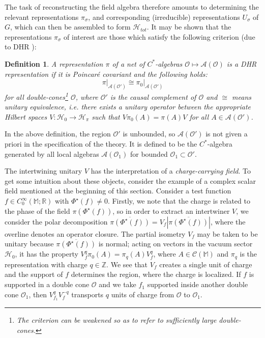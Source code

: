 \documentclass[12pt]{article}
\newcommand{\1}{\mathds{1}}                         %
\newcommand{\ZZ}{\mathbb{Z}} %
\newcommand{\RR}{\mathbb{R}}           %
\newcommand{\M}{\mathbb{M}} 	     %
\newcommand{\Hcal}{\mathcal {H}}
\newcommand{\Ocal}{\mathcal{O}}
\newcommand{\MM}{\mathbb{M}}
\newcommand{\HH}{{\mathcal{H}}}
\newcommand{\Ac}{{\mathcal{A}}}
\newcommand{\Cc}{{\mathcal{C}}}
\newcommand{\CoinX}[1]{C_0^\infty(#1)}
\newcommand{\be}{\begin{equation}}
\newcommand{\ee}{\end{equation}}
\newtheorem{df}[theorem]{Definition}}
\begin{document}
The task of reconstructing the field algebra therefore amounts to determining the relevant representations $\pi_\sigma$, and corresponding (irreducible) representations $U_\sigma$ of $G$, which
can then be assembled to form $\Hcal_{tot}$. It may be shown that the representations $\pi_\sigma$ of interest are those which satisfy the following criterion (due to DHR \cite{DHR3}):
\vskip 0.1in
\begin{df}
	A representation $\pi$ of a net of $C^*$-algebras $\Ocal\mapsto\Ac(\Ocal)$ is a \emph{DHR representation} if it is Poincar\'e covariant and the following holds:
	\be\label{DHRcrit}
	\pi\big|_{\Ac(\Ocal')}\cong \pi_0\big|_{\Ac(\Ocal')}
	\ee
	for all double-cones\footnote{The criterion can be weakened so as to refer to sufficiently large double-cones.} $\Ocal$, where $\Ocal'$ is the causal complement of $\Ocal$ and $\cong$ means unitary equivalence, i.e. there exists a unitary operator between the appropriate Hilbert spaces $V:\Hcal_{0}\rightarrow \Hcal_{\pi}$ such that $V\pi_0(A)=\pi(A) V$ for all $A\in \Ac(\Ocal')$.
\end{df}
In the above definition, the region $\Ocal'$ is unbounded, so $\Ac(\Ocal')$ is not given a priori in the specification of the theory. It is defined to be the $C^*$-algebra generated by all local algebras $\Ac(\Ocal_1)$ for bounded $\Ocal_1\subset \Ocal'$. 

The intertwining unitary $V$ has the interpretation of a \emph{charge-carrying field}. To get some intuition about these objects, consider the example of a complex scalar field mentioned at the beginning of this section.
Consider a test function $f\in\CoinX{\MM;\RR}$ with $\Phi^\star(f)\neq 0$. Firstly, we note that the charge is related to the phase of the field $\pi(\Phi^\star(f))$, so in order to extract an intertwiner $V$, we consider the polar decomposition $\overline{\pi(\Phi^\star(f))}=V_f |\overline{\pi(\Phi^\star(f))}|$, where the overline denotes an operator closure. The partial isometry $V_f$ may be taken to be unitary because $\overline{\pi(\Phi^\star(f))}$ is normal; acting on vectors in the vacuum sector $\HH_0$, it has the property $V_f^q \pi_0(A)= \pi_q(A)V_f^q$, where $A\in\Cc(\M)$ and $\pi_q$ is the representation with charge $q\in\ZZ$. We see that $V_f$ creates a single unit of charge and the support of $f$ determines the region, where the charge is localized. If $f$ is supported in a double cone $\Ocal$ and we take $f_1$ supported inside another double cone $\Ocal_1$, then $V_{f_1}^q V_f^{-q}$ transports $q$ units of charge from $\Ocal$ to $\Ocal_1$. 
\end{document}
